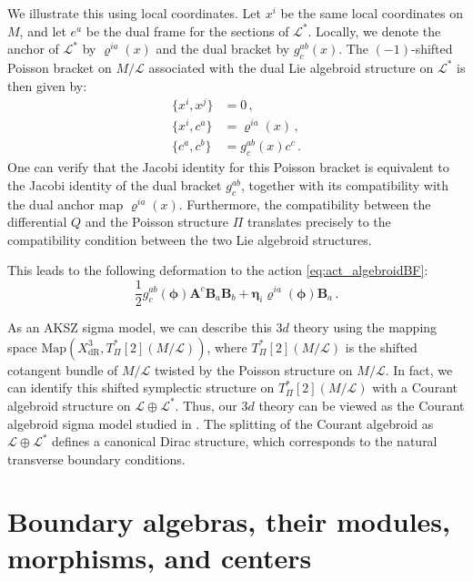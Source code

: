 \documentclass[11pt]{article}
\newcommand{\derham}{\mathrm{dR}}
\numberwithin{equation}{section}
\begin{document}
We illustrate this using local coordinates. Let $x^i$ be the same local coordinates on $M$, and let $e^a$ be the dual frame for the sections of $\mathcal{L}^*$. Locally, we denote the anchor of $\mathcal{L}^*$ by $\varrho^{ia}(x)$ and the dual bracket by $g^{ab}_c(x)$. The $(-1)$-shifted Poisson bracket on $M/\mathcal{L}$ associated with the dual Lie algebroid structure on $\mathcal{L}^*$ is then given by:
\begin{equation}
	\begin{aligned}
		\{x^i,x^j\} &= 0\,,\\
		\{x^i,c^a\} &= \varrho^{ia}(x)\,,\\
		\{c^a,c^b\} &= g^{ab}_c(x)c^c\,.
	\end{aligned}
\end{equation}
One can verify that the Jacobi identity for this Poisson bracket is equivalent to the Jacobi identity of the dual bracket $g^{ab}_c$, together with its compatibility with the dual anchor map $\varrho^{ia}(x)$. Furthermore, the compatibility between the differential $Q$ and the Poisson structure $\Pi$ translates precisely to the compatibility condition between the two Lie algebroid structures.

This leads to the following deformation to the action \eqref{eq:act_algebroidBF}:
\begin{equation}
	 \frac{1}{2}g^{ab}_c(\boldsymbol{\phi}) \boldsymbol{A}^c \boldsymbol{B}_a\boldsymbol{B}_b + \boldsymbol{\eta}_i \varrho^{ia}(\boldsymbol{\phi})\boldsymbol{B}_a\,.
\end{equation}

As an AKSZ sigma model, we can describe this $3d$ theory using the mapping space $\mathrm{Map}(X^3_{\derham}, T_{\Pi}^*[2](M/\mathcal{L}))$, where $T_{\Pi}^*[2](M/\mathcal{L})$ is the shifted cotangent bundle of $M/\mathcal{L}$ twisted by the Poisson structure on $M/\mathcal{L}$. In fact, we can identify this shifted symplectic structure on $T_{\Pi}^*[2](M/\mathcal{L})$ with a Courant algebroid structure on $\mathcal{L}\oplus \mathcal{L}^*$. Thus, our $3d$ theory can be viewed as the Courant algebroid sigma model studied in \cite{roytenberg2007aksz}. The splitting of the Courant algebroid as $\mathcal{L} \oplus \mathcal{L}^*$ defines a canonical Dirac structure, which corresponds to the natural transverse boundary conditions. 
 
\section{Boundary algebras, their modules, morphisms, and centers}
 \label{sec:top_bdy}
\end{document}
